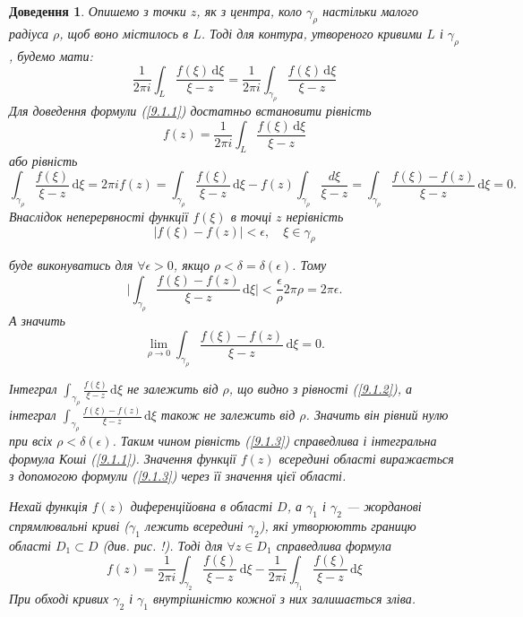 \documentclass[12pt,fleqn]{article}
\theoremstyle{theorem}
\theoremstyle{proof}
\newtheorem*{dov}{Доведення}
\numberwithin{figure}{section}
\numberwithin{equation}{section}
\begin{document}
\begin{dov}
Опишемо з точки $z$, як з центра, коло $\gamma_\rho$ настільки малого радіуса $\rho$, щоб воно містилось в $L$. Тоді для контура, утвореного кривими $L$ і $\gamma_\rho$, будемо мати:
\begin{equation}\label{9.1.2}
\frac{1}{2\pi i}\int_{L}\frac{f(\xi)\,\mathrm{d}\xi}{\xi-z} = \frac{1}{2\pi i}\int_{\gamma_\rho} \frac{f(\xi)\,\mathrm{d}\xi}{\xi-z}
\end{equation}
Для доведення формули (\ref{9.1.1}) достатньо встановити рівність
\[ f(z)= \frac{1}{2\pi i} \int_{L}\frac{f(\xi)\,\mathrm{d}\xi}{\xi-z} \]
або рівність
\begin{equation}\label{9.1.3}
\int_{\gamma_\rho}\frac{f(\xi)}{\xi-z}\,\mathrm{d}\xi=2\pi if(z) = \int_{\gamma_\rho}\frac{f(\xi)}{\xi-z}\,\mathrm{d}\xi-f(z)\int_{\gamma_\rho}\frac{d\xi}{\xi-z}=\int_{\gamma_\rho}\frac{f(\xi)-f(z)}{\xi-z}\,\mathrm{d}\xi=0.
\end{equation}
Внаслідок неперервності функції $f(\xi)$ в точці $z$ нерівність
\[ |f(\xi)-f(z)|<\epsilon, \quad \xi\in\gamma_\rho \]

буде виконуватись для $\forall\epsilon>0$, якщо $\rho<\delta=\delta(\epsilon)$. Тому
\[ \bigg| \int_{\gamma_\rho} \frac{f(\xi)-f(z)}{\xi-z}\,\mathrm{d}\xi \bigg|< \frac{\epsilon}{\rho} 2\pi\rho=2\pi\epsilon. \]
А значить
\[ \lim_{\rho \to 0} \int_{\gamma_\rho} \frac{f(\xi)-f(z)}{\xi-z}\,\mathrm{d}\xi=0. \]

Інтеграл $\int_{\gamma_\rho} \frac{f(\xi)}{\xi - z}\,\mathrm{d}\xi$ не залежить від $\rho$, що видно з рівності (\ref{9.1.2}), а інтеграл $\int_{\gamma_\rho} \frac{f(\xi)-f(z)}{\xi - z}\,\mathrm{d}\xi$ також не залежить від $\rho$. Значить він рівний нулю при всіх $\rho < \delta(\epsilon)$. Таким чином рівність (\ref{9.1.3}) справедлива і інтегральна формула Коші (\ref{9.1.1}).
Значення функції $f(z)$ всередині області виражається з допомогою формули (\ref{9.1.3}) через її значення цієї області.

Нехай функція $f(z)$ диференційовна в області $D$, а $\gamma_1$ і $\gamma_2$ --- жорданові спрямлювальні криві ($\gamma_1$ лежить всередині $\gamma_2$), які утворюютть границю області $D_1 \subset D$ (див. рис. !). Тоді для $\forall z \in D_1$ справедлива формула
\begin{equation}\label{9.1.4}
f(z)=\frac{1}{2\pi i}\int_{\gamma_2}\frac{f(\xi)}{\xi-z}\,\mathrm{d}\xi-\frac{1}{2\pi i}\int_{\gamma_1}\frac{f(\xi)}{\xi-z}\,\mathrm{d}\xi
\end{equation}
При обході кривих $\gamma_2$ і $\gamma_1$ внутрішністю кожної з них залишається зліва.
\end{dov}
\end{document}
